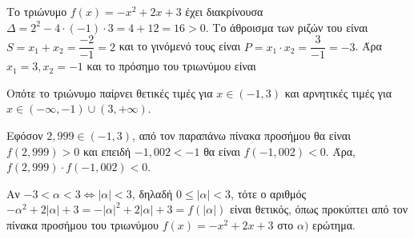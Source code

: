 
\begin{alist}
\item Το τριώνυμο $f(x) = -x^2 + 2x + 3$ έχει διακρίνουσα $\Delta = 2^2 - 4 \cdot (-1) \cdot 3 = 4 + 12 = 16 > 0$. Το
άθροισμα των ριζών του είναι $S = x_1 + x_2 = \dfrac{-2}{-1} = 2$ και το γινόμενό τους είναι
$P = x_1 \cdot x_2 = \dfrac{3}{-1} = -3$. Άρα $x_1 = 3, x_2 = -1$ και το πρόσημο του τριωνύμου είναι

\begin{center}
\end{center}

Οπότε το τριώνυμο παίρνει θετικές τιμές για $x \in (-1, 3)$ και αρνητικές τιμές για
$x \in (-\infty, -1) \cup (3, +\infty)$.

\item Εφόσον $2,999 \in (-1, 3)$, από τον παραπάνω πίνακα προσήμου θα είναι $f(2,999) > 0$ και
επειδή $-1,002 < -1$ θα είναι $f(-1,002) < 0$. Άρα,
$f(2,999) \cdot f(-1,002) < 0$.

\item Αν $-3 < \alpha < 3 \Leftrightarrow |\alpha| < 3$, δηλαδή $0 \le |\alpha| < 3$, τότε ο αριθμός
$-\alpha^2 + 2|\alpha| + 3 = -|\alpha|^2 + 2|\alpha| + 3 = f(|\alpha|)$ είναι θετικός, όπως προκύπτει από τον πίνακα
προσήμου του τριωνύμου $f(x) = -x^2 + 2x + 3$ στο $\alpha)$ ερώτημα.
\end{alist}

